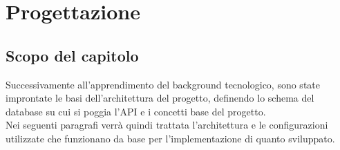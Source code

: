 \chapter{Progettazione}
\label{cap:progettazione}

\section{Scopo del capitolo}
Successivamente all'apprendimento del background tecnologico, sono state improntate le basi dell'architettura del progetto, definendo lo schema del database su cui si poggia l'API e i concetti base del progetto.\\
Nei seguenti paragrafi verrà quindi trattata l'architettura e le configurazioni utilizzate che funzionano da base per l'implementazione di quanto sviluppato.\\




















